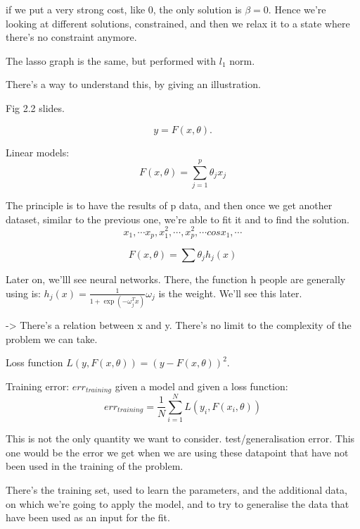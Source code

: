 \documentclass[a4paper]{tufte-book}
\begin{document}
if we put a very strong cost, like 0, the only solution is $\beta = 0$.
Hence we’re looking at different solutions, constrained, and then we relax it to a state where there’s no constraint anymore.

The lasso graph is the same, but performed with $l_1$ norm.

There’s a way to understand this, by giving an illustration.

Fig 2.2 slides.


\begin{equation}
y=F(x,\theta).
\end{equation}

Linear models:
\begin{equation}
F(x,\theta) = \sum_{j=1}^p \theta_j x_j
\end{equation}

The principle is to have the results of p data, and then once we get another dataset, similar to the previous one, we’re able to fit it and to find the solution.
\begin{equation}
x_1, \cdots x_p, x_1^2, \cdots, x_p^2, \cdots cos x_1, \cdots
\end{equation}

\begin{equation}
F(x, \theta) = \sum \theta_j h_j(x)
\end{equation}

Later on, we’lll see neural networks. There, the function h people are generally using is:
$h_j(x) = \frac{1}{1 + \exp (-\omega_j^T x )} \omega_j$ is the weight. We’ll see this later.

-> There’s a relation between x and y.
There’s no limit to the complexity of the problem we can take.

Loss function $L (y, F(x, \theta)) = (y-F(x,\theta))^2$.

Training error: $err_{training}$ given a model and given a loss function:
\begin{equation}
err_{training} = \frac{1}{N} \sum_{i=1}^N L (y_i, F(x_i,\theta))
\end{equation}

This is not the only quantity we want to consider.
test/generalisation error. This one would be the error we get when we are using these datapoint that have not been used in the training of the problem.

There’s the training set, used to learn the parameters, and the additional data, on which we’re going to apply the model, and to try to generalise the data that have been used as an input for the fit.
\end{document}
